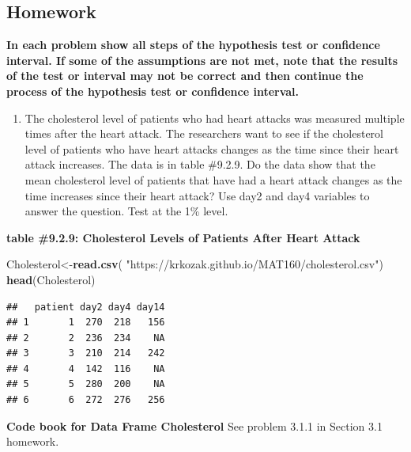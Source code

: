 \documentclass[
]{book}
\newenvironment{Shaded}{\begin{snugshade}}{\end{snugshade}}
\newcommand{\KeywordTok}[1]{\textcolor[rgb]{0.13,0.29,0.53}{\textbf{#1}}}
\newcommand{\NormalTok}[1]{#1}
\newcommand{\StringTok}[1]{\textcolor[rgb]{0.31,0.60,0.02}{#1}}
\providecommand{\tightlist}{%
  \setlength{\itemsep}{0pt}\setlength{\parskip}{0pt}}
\begin{document}
\hypertarget{homework-1}{%
\subsection{Homework}\label{homework-1}}

\textbf{In each problem show all steps of the hypothesis test or confidence interval. If some of the assumptions are not met, note that the results of the test or interval may not be correct and then continue the process of the hypothesis test or confidence interval.}

\begin{enumerate}
\def\labelenumi{\arabic{enumi}.}
\tightlist
\item
  The cholesterol level of patients who had heart attacks was measured multiple times after the heart attack. The researchers want to see if the cholesterol level of patients who have heart attacks changes as the time since their heart attack increases. The data is in table \#9.2.9. Do the data show that the mean cholesterol level of patients that have had a heart attack changes as the time increases since their heart attack? Use day2 and day4 variables to answer the question. Test at the 1\% level.
\end{enumerate}

\textbf{table \#9.2.9: Cholesterol Levels of Patients After Heart Attack}

\begin{Shaded}
\begin{Highlighting}[]
\NormalTok{Cholesterol<-}\KeywordTok{read.csv}\NormalTok{(}
  \StringTok{"https://krkozak.github.io/MAT160/cholesterol.csv"}\NormalTok{)}
\KeywordTok{head}\NormalTok{(Cholesterol)}
\end{Highlighting}
\end{Shaded}

\begin{verbatim}
##   patient day2 day4 day14
## 1       1  270  218   156
## 2       2  236  234    NA
## 3       3  210  214   242
## 4       4  142  116    NA
## 5       5  280  200    NA
## 6       6  272  276   256
\end{verbatim}

\textbf{Code book for Data Frame Cholesterol} See problem 3.1.1 in Section 3.1 homework.
\end{document}
